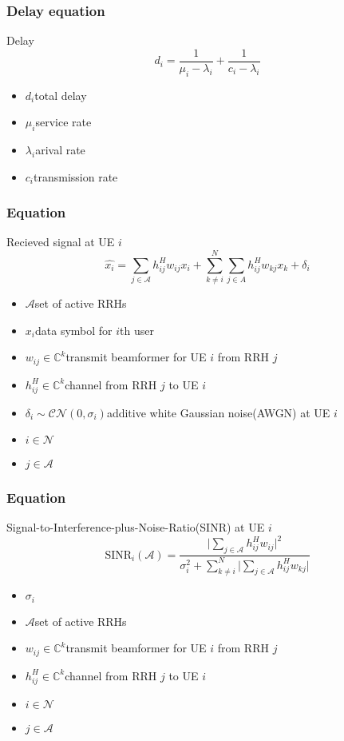 \documentclass[usenames,dvipsnames]{beamer}
\begin{document}
\begin{frame}
  \frametitle{Delay equation}
  \begin{exampleblock}{Delay}
    \[
      d_{i} = \frac{1}{\mu_{i}- \lambda_{i}} + \frac{1}{c_{i} - \lambda_{i}}
    \]
  \end{exampleblock}
  \begin{itemize}
    \item  $d_{i}$\quad total delay
    \item $\mu_{i}$\quad service rate
    \item $\lambda_{i}$\quad arival rate
    \item $c_{i}$\quad transmission rate
  \end{itemize}
\end{frame}
\begin{frame}
  \frametitle{Equation}
  \begin{exampleblock}{Recieved signal at UE $i$}
    \[
      \hat{x_{i}} = \sum_{j\in{\mathcal{A}}}^{}h_{ij}^{H}w_{ij}x_{i} + \sum_{k\neq i}^{N}\sum_{j\in{A}}^{}h_{ij}^{H}w_{kj}x_{k} + \delta_{i}
    \]
  \end{exampleblock}
  \begin{itemize}
    \item $\mathcal{A}$\qquad set of active RRHs
    \item $x_{i}$\qquad data symbol for $i$th user
    \item $w_{ij}\in\mathbb{C}^{k}$\quad transmit beamformer for UE $i$ from RRH $j$
    \item $h_{ij}^{H}\in\mathbb{C}^{k}$\quad channel from RRH $j$ to UE $i$
    \item $\delta_{i}\sim\mathcal{C}\mathcal{N}(0,\sigma_{i})$\quad additive white Gaussian noise(AWGN) at UE $i$
    \item $i\in\mathcal{N}$
    \item $j\in\mathcal{A}$
  \end{itemize}
\end{frame}
\begin{frame}
  \frametitle{Equation}
  \begin{exampleblock}{Signal-to-Interference-plus-Noise-Ratio(SINR) at UE $i$}
    \[
      \text{SINR}_{i}(\mathcal{A}) = \frac{\bigg\lvert\sum\limits_{j\in{\mathcal{A}}}^{}h_{ij}^{H}w_{ij}\bigg\rvert^2}{\sigma_{i}^2 + \sum\limits_{k\neq i}^{N}\bigg\lvert\sum\limits_{j\in{\mathcal{A}}}^{}h_{ij}^{H}w_{kj}\bigg\rvert}
    \]
  \end{exampleblock}
  \begin{itemize}
    \item $\sigma_{i}$
    \item $\mathcal{A}$\qquad set of active RRHs
    \item $w_{ij}\in\mathbb{C}^{k}$\quad transmit beamformer for UE $i$ from RRH $j$
    \item $h_{ij}^{H}\in\mathbb{C}^{k}$\quad channel from RRH $j$ to UE $i$
    \item $i\in\mathcal{N}$
    \item $j\in\mathcal{A}$
  \end{itemize}
\end{frame}
\end{document}

